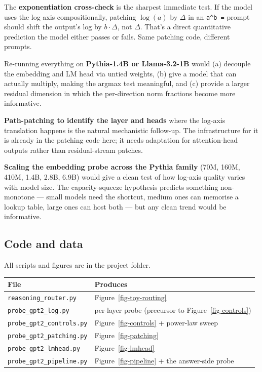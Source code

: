 \documentclass[
]{article}
\newcounter{none} %
\begin{document}
The \textbf{exponentiation cross-check} is the sharpest immediate test.
If the model uses the log axis compositionally, patching \(\log(a)\) by
\(\Delta\) in an \texttt{a\^{}b\ =} prompt should shift the output's log
by \(b \cdot \Delta\), not \(\Delta\). That's a direct quantitative
prediction the model either passes or fails. Same patching code,
different prompts.

Re-running everything on \textbf{Pythia-1.4B or Llama-3.2-1B} would (a)
decouple the embedding and LM head via untied weights, (b) give a model
that can actually multiply, making the argmax test meaningful, and (c)
provide a larger residual dimension in which the per-direction norm
fractions become more informative.

\textbf{Path-patching to identify the layer and heads} where the
log-axis translation happens is the natural mechanistic follow-up. The
infrastructure for it is already in the patching code here; it needs
adaptation for attention-head outputs rather than residual-stream
patches.

\textbf{Scaling the embedding probe across the Pythia family} (70M,
160M, 410M, 1.4B, 2.8B, 6.9B) would give a clean test of how log-axis
quality varies with model size. The capacity-squeeze hypothesis predicts
something non-monotone --- small models need the shortcut, medium ones
can memorise a lookup table, large ones can host both --- but any clean
trend would be informative.

\subsection{Code and data}\label{sec-code}

All scripts and figures are in the project folder.

{\def\LTcaptype{none} %
\begin{longtable}[]{@{}ll@{}}
\toprule\noalign{}
File & Produces \\
\midrule\noalign{}
\endhead
\bottomrule\noalign{}
\endlastfoot
\texttt{reasoning\_router.py} & Figure~\ref{fig-toy-routing} \\
\texttt{probe\_gpt2\_log.py} & per-layer probe (precursor to
Figure~\ref{fig-controls}) \\
\texttt{probe\_gpt2\_controls.py} & Figure~\ref{fig-controls} +
power-law sweep \\
\texttt{probe\_gpt2\_patching.py} & Figure~\ref{fig-patching} \\
\texttt{probe\_gpt2\_lmhead.py} & Figure~\ref{fig-lmhead} \\
\texttt{probe\_gpt2\_pipeline.py} & Figure~\ref{fig-pipeline} + the
answer-side probe \\
\end{longtable}
}
\end{document}
